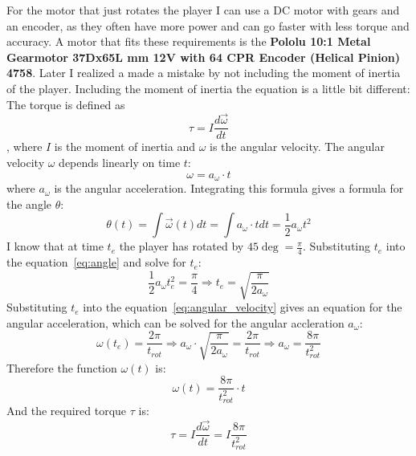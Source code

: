 For the motor that just rotates the player I can use a DC motor with gears and an encoder, as they often have more power and can go faster with less torque and accuracy.
A motor that fits these requirements is the \textbf{Pololu 10:1 Metal Gearmotor 37Dx65L mm 12V with 64 CPR Encoder (Helical Pinion) 4758}\autocite{pololu-dc}.
Later I realized a made a mistake by not including the moment of inertia of the player.
Including the moment of inertia the equation is a little bit different:
The torque is defined as
\begin{equation}
    \label{eq:torque2}
    \tau = I \frac{d\vec{\omega}}{dt}
\end{equation},
where $I$ is the moment of inertia and $\omega$ is the angular velocity.
The angular velocity $\omega$ depends linearly on time $t$:
\begin{equation}
    \label{eq:angular_velocity}
    \omega = a_\omega \cdot t
\end{equation}
where $a_\omega$ is the angular acceleration.
Integrating this formula gives a formula for the angle $\theta$:
\begin{equation}
    \label{eq:angle}
    \theta(t) = \int \vec{\omega}(t)dt = \int a_\omega \cdot t dt = \frac{1}{2} a_\omega t^2
\end{equation}
I know that at time $t_e$ the player has rotated by $45\deg = \frac{\pi}{4}$.
Substituting $t_e$ into the equation~\ref{eq:angle} and solve for $t_e$:
\begin{equation}
    \label{eq:time_to_rotate}
    \frac{1}{2} a_\omega t_e^2 = \frac{\pi}{4} \Rightarrow t_e = \sqrt{\frac{\pi}{2a_\omega}}
\end{equation}
Substituting $t_e$ into the equation~\ref{eq:angular_velocity} gives an equation for the angular acceleration, which can be solved for the angular accleration $a_\omega$:
\begin{equation}
    \label{eq:angular_acceleration}
    \omega(t_e) = \frac{2\pi}{t_{rot}} \Rightarrow a_{\omega} \cdot \sqrt {\frac{\pi}{2a_{\omega}}} = \frac{2\pi}{t_{rot}} \Rightarrow a_{\omega} = \frac{8\pi}{t_{rot}^2}
\end{equation}
Therefore the function $\omega(t)$ is:
\begin{equation}
    \label{eq:angular_velocity_function}
    \omega(t) = \frac{8\pi}{t_{rot}^2} \cdot t
\end{equation}
And the required torque $\tau$ is:
\begin{equation}
    \label{eq:torque3}
    \tau = I \frac{d\vec{\omega}}{dt} = I \frac{8\pi}{t_{rot}^2}
\end{equation}
